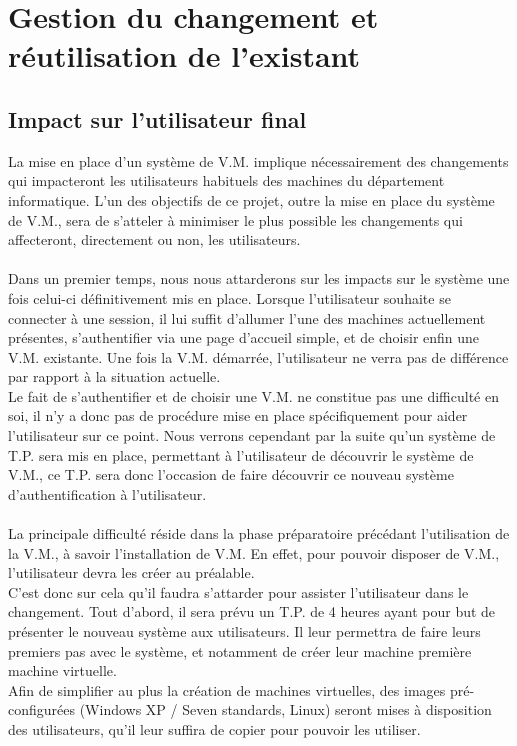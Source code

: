 \section{Gestion du changement et réutilisation de l'existant}

\subsection{Impact sur l'utilisateur final}

La mise en place d’un système de V.M. implique nécessairement des changements qui impacteront les utilisateurs habituels des machines du département informatique.
L’un des objectifs de ce projet, outre la mise en place du système de V.M., sera de s’atteler à minimiser le plus possible les changements qui affecteront, directement ou non, les utilisateurs. \\\\

Dans un premier temps, nous nous attarderons sur les impacts sur le système une fois celui-ci définitivement mis en place. Lorsque l’utilisateur souhaite se connecter à une session, il lui suffit d’allumer l’une des machines actuellement présentes, s'authentifier via une page d’accueil simple, et de choisir enfin une V.M. existante. Une fois la V.M. démarrée, l’utilisateur ne verra pas de différence par rapport à la situation actuelle.\\
Le fait de s'authentifier et de choisir une V.M. ne constitue pas une difficulté en soi, il n’y a donc pas de procédure mise en place spécifiquement pour aider l’utilisateur sur ce point. Nous verrons cependant par la suite qu’un système de T.P. sera mis en place, permettant à l’utilisateur de découvrir le système de V.M., ce T.P. sera donc l’occasion de faire découvrir ce nouveau système d’authentification à l’utilisateur.\\\\

La principale difficulté réside dans la phase préparatoire précédant l’utilisation de la V.M., à savoir l’installation de V.M. En effet, pour pouvoir disposer de V.M., l’utilisateur devra les créer au préalable.\\
C’est donc sur cela qu’il faudra s’attarder pour assister l’utilisateur dans le changement.
Tout d’abord, il sera prévu un T.P. de 4 heures ayant pour but de présenter le nouveau système aux utilisateurs. Il leur permettra de faire leurs premiers pas avec le système, et notamment de créer leur machine première machine virtuelle.\\
Afin de simplifier au plus la création de machines virtuelles, des images pré-configurées (Windows XP / Seven standards, Linux) seront mises à disposition des utilisateurs, qu’il leur suffira de copier pour pouvoir les utiliser. \\\\

